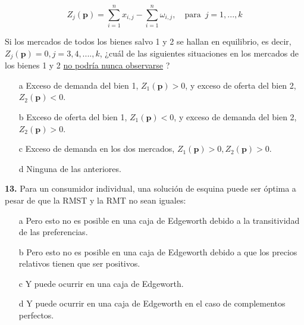 \documentclass{nuevotema}
\begin{document}
\begin{equation*}
	Z_j (\textbf{p}) = \sum_{i=1}^n x_{i,j} - \sum_{i=1}^n \omega_{i,j}, \quad \text{para } \, j= 1, ...,k
\end{equation*}

Si los mercados de todos los bienes salvo 1 y 2 se hallan en equilibrio, es decir, $Z_j(\textbf{p}) = 0, j=3, 4, ...., k$, ¿cuál de las siguientes situaciones en los mercados de los bienes 1 y 2 \underline{no podría nunca observarse} ?

\begin{itemize}
	\item[a] Exceso de demanda del bien 1, $Z_1(\textbf{p}) >0$, y exceso de oferta del bien 2, $Z_2(\textbf{p}) < 0$. 
	\item[b] Exceso de oferta del bien 1, $Z_1(\textbf{p}) < 0$, y exceso de demanda del bien 2, $Z_2(\textbf{p}) > 0$.
	\item[c] Exceso de demanda en los dos mercados, $Z_1(\textbf{p}) >0, Z_2 (\textbf{p}) > 0$.
	\item[d] Ninguna de las anteriores.
\end{itemize}


\textbf{13.} Para un consumidor individual, una solución de esquina puede ser óptima a pesar de que la RMST y la RMT no sean iguales:

\begin{itemize}
	\item[a] Pero esto no es posible en una caja de Edgeworth debido a la transitividad de las preferencias.
	\item[b] Pero esto no es posible en una caja de Edgeworth debido a que los precios relativos tienen que ser positivos.
	\item[c] Y puede ocurrir en una caja de Edgeworth.
	\item[d] Y puede ocurrir en una caja de Edgeworth en el caso de complementos perfectos.
\end{itemize}
\end{document}
